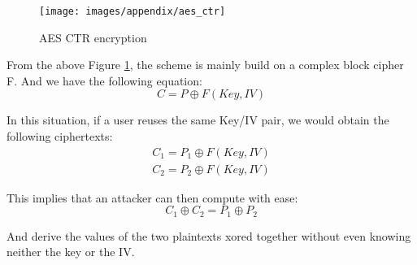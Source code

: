 \documentclass[../main.tex]{subfiles}
\begin{document}
\begin{figure}[h]
    \centering
    \texttt{[image: images/appendix/aes\_ctr]}
    
    \caption{AES CTR encryption}
    \label{appendix:figure:aes_ctr}
\end{figure}

\par From the above Figure \ref{appendix:figure:aes_ctr}, the scheme is mainly build on a complex block cipher F. And we have the following equation:
\begin{equation}
    C = P \oplus F(Key, IV)
\end{equation}
\par In this situation, if a user reuses the same Key/IV pair, we would obtain the following ciphertexts:
\begin{equation}
    \begin{split}
        C_1 = P_1 \oplus F(Key, IV)\\
        C_2 = P_2 \oplus F(Key, IV)
    \end{split}
\end{equation}
\par This implies that an attacker can then compute with ease:
\begin{equation}
    C_1 \oplus C_2 = P_1 \oplus P_2
\end{equation}
\par And derive the values of the two plaintexts xored together without even knowing neither the key or the IV.
\end{document}
